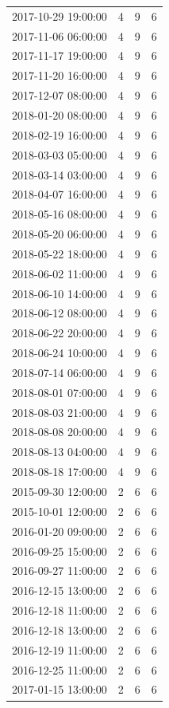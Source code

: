 \begin{tabular}{lrrr}
2017-10-29 19:00:00 & 4 & 9 & 6 \\
2017-11-06 06:00:00 & 4 & 9 & 6 \\
2017-11-17 19:00:00 & 4 & 9 & 6 \\
2017-11-20 16:00:00 & 4 & 9 & 6 \\
2017-12-07 08:00:00 & 4 & 9 & 6 \\
2018-01-20 08:00:00 & 4 & 9 & 6 \\
2018-02-19 16:00:00 & 4 & 9 & 6 \\
2018-03-03 05:00:00 & 4 & 9 & 6 \\
2018-03-14 03:00:00 & 4 & 9 & 6 \\
2018-04-07 16:00:00 & 4 & 9 & 6 \\
2018-05-16 08:00:00 & 4 & 9 & 6 \\
2018-05-20 06:00:00 & 4 & 9 & 6 \\
2018-05-22 18:00:00 & 4 & 9 & 6 \\
2018-06-02 11:00:00 & 4 & 9 & 6 \\
2018-06-10 14:00:00 & 4 & 9 & 6 \\
2018-06-12 08:00:00 & 4 & 9 & 6 \\
2018-06-22 20:00:00 & 4 & 9 & 6 \\
2018-06-24 10:00:00 & 4 & 9 & 6 \\
2018-07-14 06:00:00 & 4 & 9 & 6 \\
2018-08-01 07:00:00 & 4 & 9 & 6 \\
2018-08-03 21:00:00 & 4 & 9 & 6 \\
2018-08-08 20:00:00 & 4 & 9 & 6 \\
2018-08-13 04:00:00 & 4 & 9 & 6 \\
2018-08-18 17:00:00 & 4 & 9 & 6 \\
2015-09-30 12:00:00 & 2 & 6 & 6 \\
2015-10-01 12:00:00 & 2 & 6 & 6 \\
2016-01-20 09:00:00 & 2 & 6 & 6 \\
2016-09-25 15:00:00 & 2 & 6 & 6 \\
2016-09-27 11:00:00 & 2 & 6 & 6 \\
2016-12-15 13:00:00 & 2 & 6 & 6 \\
2016-12-18 11:00:00 & 2 & 6 & 6 \\
2016-12-18 13:00:00 & 2 & 6 & 6 \\
2016-12-19 11:00:00 & 2 & 6 & 6 \\
2016-12-25 11:00:00 & 2 & 6 & 6 \\
2017-01-15 13:00:00 & 2 & 6 & 6 \\

\end{tabular}
